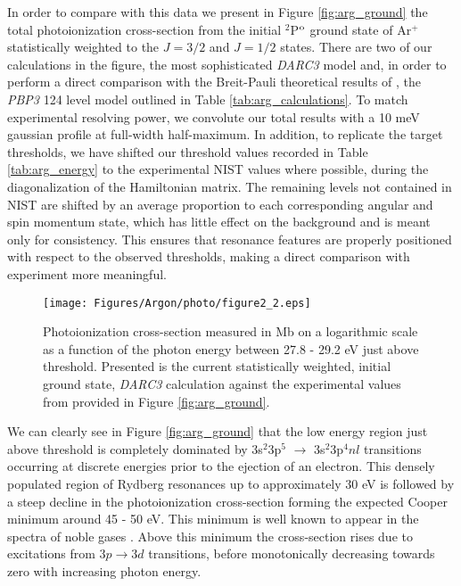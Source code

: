 In order to compare with this data we present in Figure \ref{fig:arg_ground} the total photoionization cross-section from the initial $^2$P$^{\rm{o}}$ ground state of Ar$^{+}$ statistically weighted to the $J=3/2$ and $J=1/2$ states. There are two of our calculations in the figure, the most sophisticated \textit{DARC3} model and, in order to perform a direct comparison with the Breit-Pauli theoretical results of \citet{2011PhRvA..84a3413C}, the \textit{PBP3} 124 level model outlined in Table \ref{tab:arg_calculations}. To match experimental resolving power, we convolute our total results with a 10 meV gaussian profile at full-width half-maximum. In addition, to replicate the target thresholds, we have shifted our threshold values recorded in Table \ref{tab:arg_energy} to the experimental NIST values where possible, during the diagonalization of the Hamiltonian matrix. The remaining levels not contained in NIST are shifted by an average proportion to each corresponding angular and spin momentum state, which has little effect on the background and is meant only for consistency. This ensures that resonance features are properly positioned with respect to the observed thresholds, making a direct comparison with experiment more meaningful.

%
\begin{sidewaysfigure}
\centering
\texttt{[image: Figures/Argon/photo/figure2\_2.eps]}
\caption{Photoionization cross-section measured in Mb on a logarithmic scale as a function of the photon energy between 27.8 - 29.2 eV just above threshold. Presented is the current statistically weighted, initial ground state, \textit{DARC3} calculation against the experimental values from \citet{2011PhRvA..84a3413C} provided in Figure \ref{fig:arg_ground}. \label{fig:arg_zoom}}
\end{sidewaysfigure}
%

We can clearly see in Figure \ref{fig:arg_ground} that the low energy region just above threshold is completely dominated by 3s$^2$3p$^5$ $\rightarrow$ 3s$^2$3p$^4nl$ transitions occurring at discrete energies prior to the ejection of an electron. This densely populated region of Rydberg resonances up to approximately 30 eV is followed by a steep decline in the photoionization cross-section forming the expected Cooper minimum around 45 - 50 eV. This minimum is well known to appear in the spectra of noble gases \citep{1962PhRv..128..681C}. Above this minimum the cross-section rises due to excitations from $3p \rightarrow 3d$ transitions, before monotonically decreasing towards zero with increasing photon energy. 

